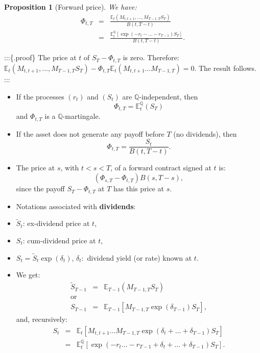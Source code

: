 \documentclass[
  12pt,
]{book}
\newtheorem{proposition}{Proposition}[chapter]
\theoremstyle{definition}
\theoremstyle{definition}
\theoremstyle{definition}
\theoremstyle{definition}
\theoremstyle{remark}
\begin{document}
\begin{proposition}[Forward price]
\protect\hypertarget{prp:fwd}{}\label{prp:fwd}We have:
\begin{eqnarray*}
\Phi_{t,T} & = & \frac{\mathbb{E}_t (M_{t,t+1}, \ldots, M_{T-1,T} S_T)}{B(t,T-t)}\\
& = & \frac{\mathbb{E}^{\mathbb{Q}}_t [\exp (-r_t - \ldots - r_{T-1}) S_T]}{B(t,T-t)}.
\end{eqnarray*}
\end{proposition}

:::\{.proof\} The price at \(t\) of \(S_T - \Phi_{t,T}\) is
zero. Therefore:
\(\mathbb{E}_t (M_{t,t+1}, \ldots, M_{T-1,T} S_T) - \Phi_{t,T} \mathbb{E}_t (M_{t,t+1} \ldots M_{T-1,T}) = 0\). The result follows.
:::

\begin{itemize}
\item
  If the processes \((r_t)\) and \((S_t)\) are \(\mathbb{Q}\)-independent, then
  \[
  \Phi_{t,T} = \mathbb{E}^{\mathbb{Q}}_t (S_T)
  \]
  and \(\Phi_{t,T}\) is a \(\mathbb{Q}\)-martingale.
\item
  If the asset does not generate any payoff before \(T\) (no dividends), then
  \[
  \Phi_{t,T} = \frac{S_t}{B(t,T-t)}.
  \]
\item
  The price at \(s\), with \(t<s<T\), of a forward contract signed at \(t\) is:
  \[
  (\Phi_{s,T} - \Phi_{t,T}) B (s,T-s),
  \]
  since the payoff \(S_T - \Phi_{t,T}\) at \(T\) has this price at \(s\).
\item
  Notations associated with \textbf{dividends}:
\item
  \(\tilde{S}_t\): ex-dividend price at \(t\),
\item
  \(S_t\): cum-dividend price at \(t\),
\item
  \(S_t = \tilde{S}_t \exp (\delta_t)\), \(\delta_t :\) dividend yield (or rate) known at \(t\).
\item
  We get:
  \begin{eqnarray*}
  \tilde{S}_{T-1} & = & \mathbb{E}_{T-1} (M_{T-1,T} S_T) \\
  \mbox{or } \\
  S_{T-1} & = & \mathbb{E}_{T-1} [M_{T-1,T} \exp (\delta_{T-1})
  S_T],
  \end{eqnarray*}
  and, recursively:
  \begin{eqnarray*}
  S_t & = & \mathbb{E}_t [M_{t,t+1} \ldots M_{T-1,T} \exp (\delta_t + \ldots + \delta_{T-1}) S_T] \\
  &=& \mathbb{E}^{\mathbb{Q}}_t [\exp (-r_t \ldots - r_{T-1} + \delta_t + \ldots + \delta_{T-1}) S_T].
  \end{eqnarray*}
\end{itemize}
\end{document}
